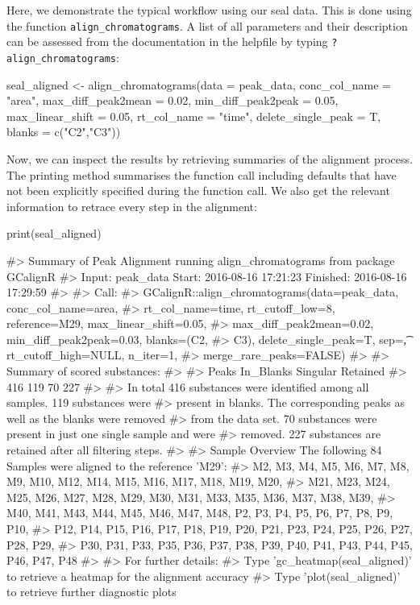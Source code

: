 Here, we demonstrate the typical workflow using our seal data. This is
done using the function \texttt{align\_chromatograms}. A list of all
parameters and their description can be assessed from the documentation
in the helpfile by typing \texttt{?align\_chromatograms}:

\begin{Schunk}
\begin{Sinput}
seal_aligned <- align_chromatograms(data = peak_data,
                    conc_col_name = "area",
                    max_diff_peak2mean = 0.02,
                    min_diff_peak2peak = 0.05,
                    max_linear_shift = 0.05,
                    rt_col_name = "time",
                    delete_single_peak = T,
                    blanks = c("C2","C3"))
\end{Sinput}
\end{Schunk}

Now, we can inspect the results by retrieving summaries of the alignment
process. The printing method summarises the function call including
defaults that have not been explicitly specified during the function
call. We also get the relevant information to retrace every step in the
alignment:

\begin{Schunk}
\begin{Sinput}
print(seal_aligned)
\end{Sinput}
\begin{Soutput}
#>   Summary of Peak Alignment running align_chromatograms from package GCalignR
#>   Input: peak_data   Start:  2016-08-16 17:21:23     Finished:  2016-08-16 17:29:59 
#> 
#> Call:
#>   GCalignR::align_chromatograms(data=peak_data, conc_col_name=area,
#>   rt_col_name=time, rt_cutoff_low=8, reference=M29, max_linear_shift=0.05,
#>   max_diff_peak2mean=0.02, min_diff_peak2peak=0.03, blanks=(C2,
#>   C3), delete_single_peak=T, sep=\t, rt_cutoff_high=NULL, n_iter=1,
#>   merge_rare_peaks=FALSE)
#> 
#> Summary of scored substances:
#> 
#>     Peaks In_Blanks  Singular  Retained 
#>       416       119        70       227 
#> 
#>   In total 416 substances were identified among all samples. 119 substances were
#>   present in blanks. The corresponding peaks as well as the blanks were removed
#>   from the data set. 70 substances were present in just one single sample and were
#>   removed. 227 substances are retained after all filtering steps.
#> 
#> Sample Overview  The following 84 Samples were aligned to the reference 'M29':
#>   M2, M3, M4, M5, M6, M7, M8, M9, M10, M12, M14, M15, M16, M17, M18, M19, M20,
#>   M21, M23, M24, M25, M26, M27, M28, M29, M30, M31, M33, M35, M36, M37, M38, M39,
#>   M40, M41, M43, M44, M45, M46, M47, M48, P2, P3, P4, P5, P6, P7, P8, P9, P10,
#>   P12, P14, P15, P16, P17, P18, P19, P20, P21, P23, P24, P25, P26, P27, P28, P29,
#>   P30, P31, P33, P35, P36, P37, P38, P39, P40, P41, P43, P44, P45, P46, P47, P48
#> 
#> For further details:
#>   Type 'gc_heatmap(seal_aligned)' to retrieve a heatmap for the alignment accuracy
#>   Type 'plot(seal_aligned)' to retrieve further diagnostic plots
\end{Soutput}
\end{Schunk}

